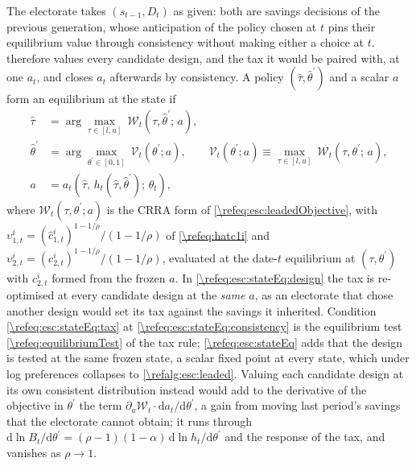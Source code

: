The electorate takes $\left(s_{t-1},D_t\right)$ as given: both are savings decisions of the previous generation, whose anticipation of the policy chosen at $t$ pins their equilibrium value through consistency without making either a choice at $t$.  therefore values every candidate design, and the tax it would be paired with, at one $a_t$, and closes $a_t$ afterwards by consistency. A policy $\left(\hat{\tau},\hat{\theta}^{\prime}\right)$ and a scalar $a$ form an equilibrium at the state if
\begin{subequations}\label{\refeq:esc:stateEq}
\begin{align}
    \hat{\tau} &= \arg\max_{\tau\in[l,u]}\ \mathcal{W}_t\left(\tau,\hat{\theta}^{\prime};\,a\right), \label{\refeq:esc:stateEq:tax}\\
    \hat{\theta}^{\prime} &= \arg\max_{\theta^{\prime}\in[0,1]}\ \mathcal{V}_t\left(\theta^{\prime};a\right), \qquad \mathcal{V}_t\left(\theta^{\prime};a\right)\equiv\max_{\tau\in[l,u]}\ \mathcal{W}_t\left(\tau,\theta^{\prime};\,a\right), \label{\refeq:esc:stateEq:design}\\
    a &= a_t\left(\hat{\tau},\,h_t\left(\hat{\tau},\hat{\theta}^{\prime}\right);\,\theta_t\right), \label{\refeq:esc:stateEq:consistency}
\end{align}
\end{subequations}
where $\mathcal{W}_t\left(\tau,\theta^{\prime};a\right)$ is the CRRA form of \eqref{\refeq:esc:leadedObjective}, with $\upsilon_{1,t}^i = \left(\hat{c}_{1,t}^i\right)^{1-1/\rho}/(1-1/\rho)$ of \eqref{\refeq:hatc1i} and $\upsilon_{2,t}^i = \left(c_{2,t}^i\right)^{1-1/\rho}/(1-1/\rho)$, evaluated at the date-$t$ equilibrium at $\left(\tau,\theta^{\prime}\right)$ with $c_{2,t}^i$ formed from the frozen $a$. In \eqref{\refeq:esc:stateEq:design} the tax is re-optimised at every candidate design at the \emph{same} $a$, as an electorate that chose another design would set its tax against the savings it inherited. Condition \eqref{\refeq:esc:stateEq:tax} at \eqref{\refeq:esc:stateEq:consistency} is the equilibrium test \eqref{\refeq:equilibriumTest} of the tax rule; \eqref{\refeq:esc:stateEq} adds that the design is tested at the same frozen state, a scalar fixed point at every state, which under log preferences collapses to \cref{\refalg:esc:leaded}. Valuing each candidate design at its own consistent distribution instead would add to the derivative of the objective in $\theta^{\prime}$ the term $\partial_a\mathcal{W}_t\cdot\mathrm{d}a_t/\mathrm{d}\theta^{\prime}$, a gain from moving last period's savings that the electorate cannot obtain; it runs through $\mathrm{d}\ln B_t/\mathrm{d}\theta^{\prime} = (\rho-1)(1-\alpha)\,\mathrm{d}\ln h_t/\mathrm{d}\theta^{\prime}$ and the response of the tax, and vanishes as $\rho\rightarrow1$.

